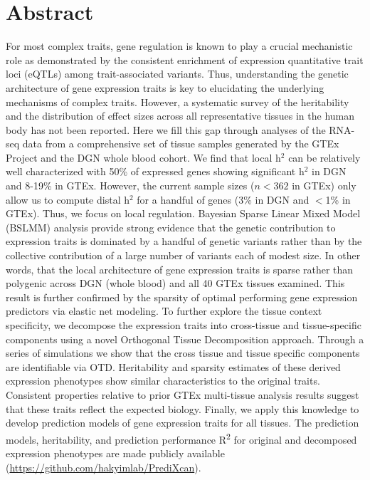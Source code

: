 \documentclass[10pt,letterpaper]{article}
\begin{document}
\pagebreak{}

\section*{Abstract}
For most complex traits, gene regulation is known to play a crucial mechanistic role as demonstrated by the consistent enrichment of expression quantitative trait loci (eQTLs) among trait-associated variants. Thus, understanding the genetic architecture of gene expression traits is key to elucidating the underlying mechanisms of complex traits. However, a systematic survey of the heritability and the distribution of effect sizes across all representative tissues in the human body has not been reported. Here we fill this gap through analyses of the RNA-seq data from a comprehensive set of tissue samples generated by the GTEx Project and the DGN whole blood cohort. We find that local h$^2$ can be relatively well characterized with 50\% of expressed genes showing significant h$^2$ in DGN and 8-19\% in GTEx. However, the current sample sizes ($n<362$ in GTEx) only allow us to compute distal h$^2$ for a handful of genes (3\% in DGN and $<$1\% in GTEx). Thus, we focus on local regulation. Bayesian Sparse Linear Mixed Model (BSLMM) analysis provide strong evidence that the genetic contribution to expression traits is dominated by a handful of genetic variants rather than by the collective contribution of a large number of variants each of modest size. In other words, that the local architecture of gene expression traits is sparse rather than polygenic across DGN (whole blood) and all 40 GTEx tissues examined. This result is further confirmed by the sparsity of optimal performing gene expression predictors via elastic net modeling. To further explore the tissue context specificity, we decompose the expression traits into cross-tissue and tissue-specific components using a novel Orthogonal Tissue Decomposition approach. Through a series of simulations we show that the cross tissue and tissue specific components are identifiable via OTD. Heritability and sparsity estimates of these derived expression phenotypes show similar characteristics to the original traits. Consistent properties relative to prior GTEx multi-tissue analysis results suggest that these traits reflect the expected biology. Finally, we apply this knowledge to develop prediction models of gene expression traits for all tissues. The prediction models, heritability, and prediction performance R\textsuperscript{2} for original and decomposed expression phenotypes are made publicly available (\url{https://github.com/hakyimlab/PrediXcan}).
\end{document}

